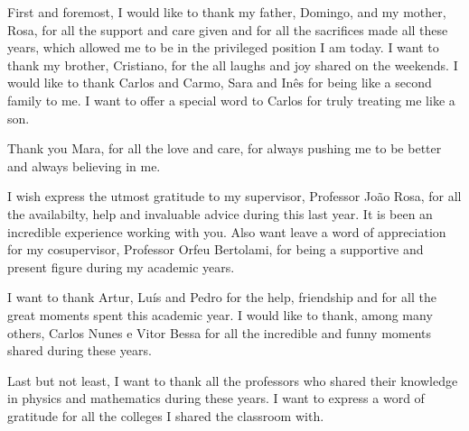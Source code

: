 \documentclass[11pt, oneside]{Thesis} %
\begin{document}
\pagestyle{empty}

\cleardoublepage

\cleardoublepage
\pagestyle{fancy}



\frontmatter %

\maketitle

 




\begin{acknowledgements}
	First and foremost, I would like to thank my father, Domingo, and my mother, Rosa, for all the support and care given and for all the sacrifices made all these years, which allowed me to be in the privileged position I am today.
	I want to thank my brother, Cristiano, for the all laughs and joy shared on the weekends.
	I would like to thank Carlos and Carmo, Sara and Inês for being like a second family to me. I want to offer a special word to Carlos for truly treating me like a son.
	
	Thank you Mara, for all the love and care, for always pushing me to be better and always believing in me.

	I wish express the utmost gratitude to my supervisor, Professor João Rosa, for all the availabilty, help and invaluable advice during this last year. It is been an incredible experience working with you. Also want leave a word of appreciation for my cosupervisor, Professor Orfeu Bertolami, for being a supportive and present figure during my academic years.
	
	I want to thank Artur, Luís and Pedro for the help, friendship and for all the great moments spent this academic year.
	I would like to thank, among many others, Carlos Nunes e Vitor Bessa for all the incredible and funny moments shared during these years.

	Last but not least, I want to thank all the professors who shared their knowledge in physics and mathematics during these years.
	I want to express a word of gratitude for all the colleges I shared the classroom with.

\end{acknowledgements}
\end{document}
